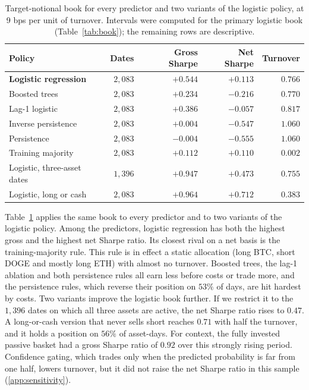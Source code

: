 \documentclass[preprint,12pt,authoryear,a4paper]{elsarticle}
\begin{document}
\begin{table}[htbp]\centering\small
\caption{Target-notional book for every predictor and two variants of the logistic
policy, at 9 bps per unit of turnover. Intervals were computed for the primary
logistic book (Table~\ref{tab:book}); the remaining rows are descriptive.}
\label{tab:variants}
\begin{tabular}{@{}lrrrr@{}}
\toprule
Policy & Dates & Gross Sharpe & Net Sharpe & Turnover \\
\midrule
\textbf{Logistic regression}        & $2{,}083$ & $\mathbf{+0.544}$ & $\mathbf{+0.113}$ & $0.766$ \\
Boosted trees                       & $2{,}083$ & $+0.234$ & $-0.216$ & $0.770$ \\
Lag-1 logistic                      & $2{,}083$ & $+0.386$ & $-0.057$ & $0.817$ \\
Inverse persistence                 & $2{,}083$ & $+0.004$ & $-0.547$ & $1.060$ \\
Persistence                         & $2{,}083$ & $-0.004$ & $-0.555$ & $1.060$ \\
Training majority                   & $2{,}083$ & $+0.112$ & $+0.110$ & $0.002$ \\
\midrule
Logistic, three-asset dates         & $1{,}396$ & $+0.947$ & $+0.473$ & $0.755$ \\
Logistic, long or cash              & $2{,}083$ & $+0.964$ & $+0.712$ & $0.383$ \\
\bottomrule
\end{tabular}
\end{table}

Table~\ref{tab:variants} applies the same book to every predictor and to two
variants of the logistic policy. Among the predictors, logistic regression has both
the highest gross and the highest net Sharpe ratio. Its closest rival on a net basis
is the training-majority rule. This rule is in effect a static allocation (long
BTC, short DOGE and mostly long ETH) with almost no turnover. Boosted trees, the
lag-1 ablation and both persistence rules all earn less before costs or trade more,
and the persistence rules, which reverse their position on $53\%$ of days, are hit
hardest by costs. Two variants improve the logistic book further. If we restrict it
to the $1{,}396$ dates on which all three assets are active, the net Sharpe ratio
rises to $0.47$. A long-or-cash version that never sells short reaches $0.71$ with
half the turnover, and it holds a position on $56\%$ of asset-days. For context,
the fully invested passive basket had a gross Sharpe ratio of $0.92$ over this
strongly rising period. Confidence gating, which trades only when the predicted
probability is far from one half, lowers turnover, but it did not raise the net
Sharpe ratio in this sample (\ref{app:sensitivity}).
\end{document}
